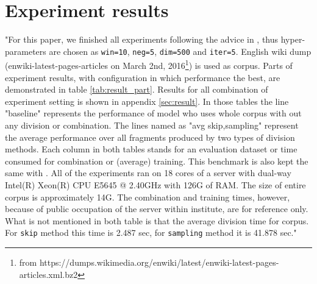 \section{Experiment results} \label{experiment_results}
"For this paper, we finished all experiments following the advice in \cite{levy2015improving}, thus hyper-parameters are chosen as \verb|win=10|, \verb|neg=5|, \verb|dim=500| and \verb|iter=5|. English wiki dump (enwiki-latest-pages-articles on March 2nd, 2016\footnote{from https://dumps.wikimedia.org/enwiki/latest/enwiki-latest-pages-articles.xml.bz2}) is used as corpus. Parts of experiment results, with configuration in which performance the best, are demonstrated in table \ref{tab:result_part}. Results for all combination of experiment setting is shown in appendix \ref{sec:result}. In those tables the line "baseline" represents the performance of model who uses whole corpus with out any division or combination. The lines named as "avg {skip,sampling}" represent the average performance over all fragments produced by two types of division methods. Each column in both tables stands for an evaluation dataset or time consumed for combination or (average) training. This benchmark is also kept the same with \cite{levy2015improving}. All of the experiments ran on 18 cores of a server with dual-way Intel(R) Xeon(R) CPU E5645 @ 2.40GHz with 126G of RAM. The size of entire corpus is approximately 14G. The combination and training times, however, because of public occupation of the server within institute, are for reference only. What is not mentioned in both table is that the average division time for corpus. For \verb|skip| method this time is 2.487 sec, for \verb|sampling| method it is 41.878 sec."

